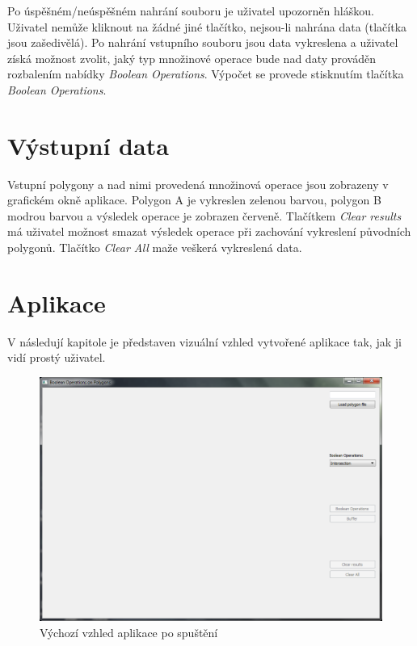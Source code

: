 \documentclass[a4paper, 12pt]{article}
\begin{document}
Po úspěšném/neúspěšném nahrání souboru je uživatel upozorněn hláškou. Uživatel nemůže kliknout na žádné jiné tlačítko, nejsou-li nahrána data (tlačítka jsou zašedivělá). Po nahrání vstupního souboru jsou data vykreslena a uživatel získá možnost zvolit, jaký typ množinové operace bude nad daty prováděn rozbalením nabídky \textsl{Boolean Operations}. Výpočet se provede stisknutím tlačítka \textsl{Boolean Operations}. 

\section{Výstupní data}
Vstupní polygony a nad nimi provedená množinová operace jsou zobrazeny v grafickém okně aplikace. Polygon A je vykreslen zelenou barvou, polygon B modrou barvou a výsledek operace je zobrazen červeně. Tlačítkem \textsl{Clear results} má uživatel možnost smazat výsledek operace při zachování vykreslení původních polygonů. Tlačítko \textsl{Clear All} maže veškerá vykreslená data.

\section{Aplikace}
V následují kapitole je představen vizuální vzhled vytvořené aplikace tak, jak ji vidí prostý uživatel.\\

\begin{figure}[h!]
	\centering
	\includegraphics[width=15cm]{./pictures/app_default.png}
	\caption{Výchozí vzhled aplikace po spuštění}
\end{figure}
\end{document}

